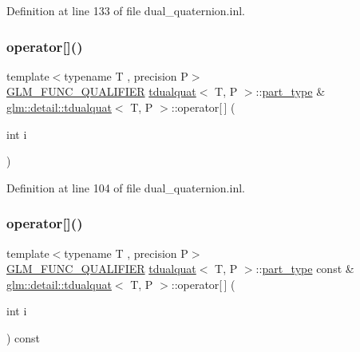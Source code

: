 Definition at line 133 of file dual\+\_\+quaternion.\+inl.

\mbox{\label{structglm_1_1detail_1_1tdualquat_a6c97baca66efdfefa2e127d4868ce22c}} 
\subsubsection{\texorpdfstring{operator[]()}{operator[]()}\hspace{0.1cm}{\footnotesize\ttfamily [1/2]}}
{\footnotesize\ttfamily template$<$typename T , precision P$>$ \\
\hyperlink{setup_8hpp_a33fdea6f91c5f834105f7415e2a64407}{G\+L\+M\+\_\+\+F\+U\+N\+C\+\_\+\+Q\+U\+A\+L\+I\+F\+I\+ER} \hyperlink{structglm_1_1detail_1_1tdualquat}{tdualquat}$<$ T, P $>$\+::\hyperlink{structglm_1_1detail_1_1tdualquat_a811e451c41fec5277ac7c99381152df4}{part\+\_\+type} \& \hyperlink{structglm_1_1detail_1_1tdualquat}{glm\+::detail\+::tdualquat}$<$ T, P $>$\+::operator\mbox{[}$\,$\mbox{]} (\begin{DoxyParamCaption}\item[{int}]{i }\end{DoxyParamCaption})}



Definition at line 104 of file dual\+\_\+quaternion.\+inl.

\mbox{\label{structglm_1_1detail_1_1tdualquat_a4cfed656116c4a21c321832ce3ea0a74}} 
\subsubsection{\texorpdfstring{operator[]()}{operator[]()}\hspace{0.1cm}{\footnotesize\ttfamily [2/2]}}
{\footnotesize\ttfamily template$<$typename T , precision P$>$ \\
\hyperlink{setup_8hpp_a33fdea6f91c5f834105f7415e2a64407}{G\+L\+M\+\_\+\+F\+U\+N\+C\+\_\+\+Q\+U\+A\+L\+I\+F\+I\+ER} \hyperlink{structglm_1_1detail_1_1tdualquat}{tdualquat}$<$ T, P $>$\+::\hyperlink{structglm_1_1detail_1_1tdualquat_a811e451c41fec5277ac7c99381152df4}{part\+\_\+type} const  \& \hyperlink{structglm_1_1detail_1_1tdualquat}{glm\+::detail\+::tdualquat}$<$ T, P $>$\+::operator\mbox{[}$\,$\mbox{]} (\begin{DoxyParamCaption}\item[{int}]{i }\end{DoxyParamCaption}) const}



